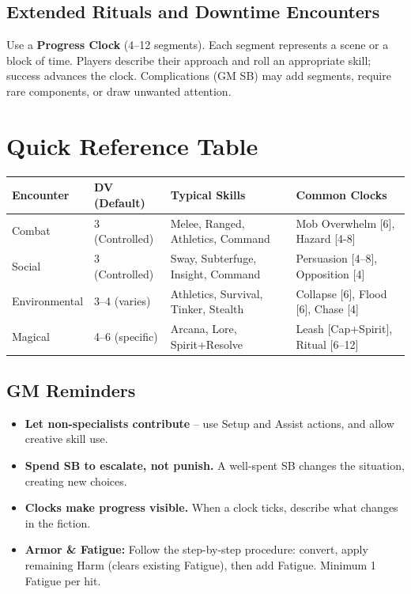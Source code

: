\subsection{Extended Rituals and Downtime Encounters}
Use a \textbf{Progress Clock} (4--12 segments). Each segment represents a scene or a block of time. Players describe their approach and roll an appropriate skill; success advances the clock. Complications (GM SB) may add segments, require rare components, or draw unwanted attention.

\section{Quick Reference Table}
\begin{center}
\begin{longtable}{p{2.2cm}p{2.2cm}p{2.2cm}p{2.2cm}}
\toprule
\textbf{Encounter} & \textbf{DV (Default)} & \textbf{Typical Skills} & \textbf{Common Clocks} \\
\midrule
Combat & 3 (Controlled) & Melee, Ranged, Athletics, Command & Mob Overwhelm [6], Hazard [4-8] \\
Social  & 3 (Controlled) & Sway, Subterfuge, Insight, Command & Persuasion [4--8], Opposition [4] \\
Environmental & 3--4 (varies) & Athletics, Survival, Tinker, Stealth & Collapse [6], Flood [6], Chase [4] \\
Magical & 4--6 (specific) & Arcana, Lore, Spirit+Resolve & Leash [Cap+Spirit], Ritual [6--12] \\
\bottomrule
\end{longtable}
\end{center}

\subsection*{GM Reminders}
\begin{itemize}[leftmargin=*]
  \item \textbf{Let non-specialists contribute} -- use Setup and Assist actions, and allow creative skill use.
  \item \textbf{Spend SB to escalate, not punish.} A well-spent SB changes the situation, creating new choices.
  \item \textbf{Clocks make progress visible.} When a clock ticks, describe what changes in the fiction.
  \item \textbf{Armor \& Fatigue:} Follow the step-by-step procedure: convert, apply remaining Harm (clears existing Fatigue), then add Fatigue. Minimum 1 Fatigue per hit.
\end{itemize}